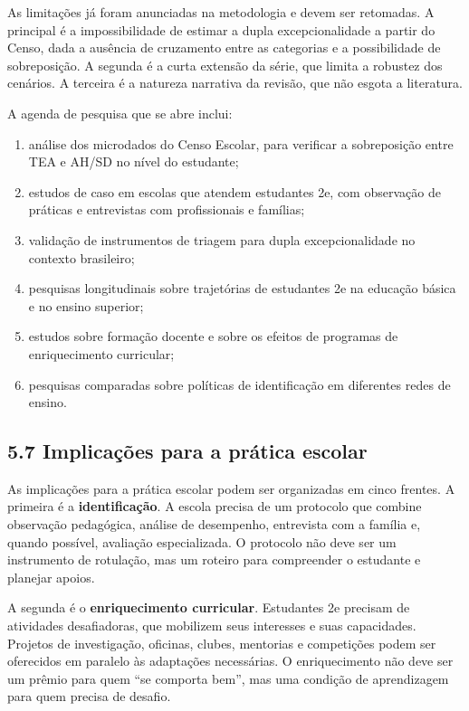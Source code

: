 As limitações já foram anunciadas na metodologia e devem ser retomadas.
A principal é a impossibilidade de estimar a dupla excepcionalidade a
partir do Censo, dada a ausência de cruzamento entre as categorias e a
possibilidade de sobreposição. A segunda é a curta extensão da série,
que limita a robustez dos cenários. A terceira é a natureza narrativa da
revisão, que não esgota a literatura.

A agenda de pesquisa que se abre inclui:

\begin{enumerate}
\def\labelenumi{\alph{enumi})}
\item
  análise dos microdados do Censo Escolar, para verificar a sobreposição
  entre TEA e AH/SD no nível do estudante;
\item
  estudos de caso em escolas que atendem estudantes 2e, com observação
  de práticas e entrevistas com profissionais e famílias;
\item
  validação de instrumentos de triagem para dupla excepcionalidade no
  contexto brasileiro;
\item
  pesquisas longitudinais sobre trajetórias de estudantes 2e na educação
  básica e no ensino superior;
\item
  estudos sobre formação docente e sobre os efeitos de programas de
  enriquecimento curricular;
\item
  pesquisas comparadas sobre políticas de identificação em diferentes
  redes de ensino.
\end{enumerate}

\subsection{5.7 Implicações para a prática
escolar}\label{implicauxe7uxf5es-para-a-pruxe1tica-escolar}

As implicações para a prática escolar podem ser organizadas em cinco
frentes. A primeira é a \textbf{identificação}. A escola precisa de um
protocolo que combine observação pedagógica, análise de desempenho,
entrevista com a família e, quando possível, avaliação especializada. O
protocolo não deve ser um instrumento de rotulação, mas um roteiro para
compreender o estudante e planejar apoios.

A segunda é o \textbf{enriquecimento curricular}. Estudantes 2e precisam
de atividades desafiadoras, que mobilizem seus interesses e suas
capacidades. Projetos de investigação, oficinas, clubes, mentorias e
competições podem ser oferecidos em paralelo às adaptações necessárias.
O enriquecimento não deve ser um prêmio para quem ``se comporta bem'',
mas uma condição de aprendizagem para quem precisa de desafio.

